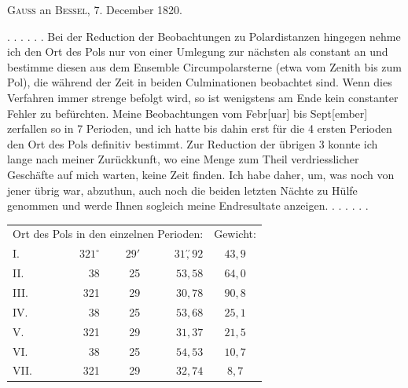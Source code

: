 \clearpage\begingroup
\hypertarget{native-333b}{}
\begin{center}\textsc{Gauss} an \textsc{Bessel}, 7. December 1820.\end{center}
\noindent\hspace*{\parindent}. . . . . . Bei der Reduction der Beobachtungen zu Polardistanzen hingegen nehme ich den Ort des Pols nur von einer Umlegung zur nächsten als
\clearpage{}
\noindent constant an und bestimme diesen aus dem Ensemble  Circumpolarsterne (etwa vom Zenith bis zum Pol), die während der Zeit in beiden Culminationen beobachtet sind. Wenn dies Verfahren immer strenge befolgt wird, so ist wenigstens am Ende kein constanter Fehler zu befürchten. Meine Beobachtungen vom Febr[uar] bis Sept[ember] zerfallen so in 7 Perioden, und ich hatte bis dahin erst für die 4 ersten Perioden den Ort des Pols definitiv bestimmt. Zur Reduction der übrigen 3 konnte ich lange nach meiner Zurückkunft, wo eine Menge zum Theil verdriesslicher Geschäfte auf mich warten, keine Zeit finden. Ich habe daher, um, was noch von jener übrig war, abzuthun, auch noch die beiden letzten Nächte zu Hülfe genommen und werde Ihnen sogleich meine Endresultate anzeigen. . . . . . .
\begin{center}\begingroup\setlength{\tabcolsep}{5pt}
\begin{tabular}{@{}lrrrc@{}}
\multicolumn{4}{c}{Ort des Pols in den einzelnen Perioden:}&Gewicht:\\
I.&\(321^\circ\)&\(29'\)&\(31\overset{\prime\prime}{,}92\)&\(43{,}9\)\\
II.&38&25&\(53{,}58\)&\(64{,}0\)\\
III.&321&29&\(30{,}78\)&\(90{,}8\)\\
IV.&38&25&\(53{,}68\)&\(25{,}1\)\\
V.&321&29&\(31{,}37\)&\(21{,}5\)\\
VI.&38&25&\(54{,}53\)&\(10{,}7\)\\
VII.&321&29&\(32{,}74\)&\(8{,}7\)
\end{tabular}\par\endgroup\end{center}

